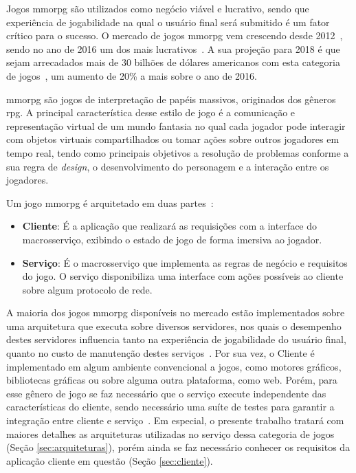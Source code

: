 Jogos \ac{mmorpg} são utilizados como negócio viável e lucrativo, sendo que experiência de jogabilidade na qual o usuário final será submitido é um fator crítico para o sucesso.
%
O mercado de jogos \ac{mmorpg} vem crescendo desde 2012~\cite{new_york_times}, sendo no ano de 2016 um dos mais lucrativos~\cite{statista_2016}.
%
A sua projeção para 2018 é que sejam arrecadados mais de 30 bilhões de dólares americanos com esta categoria de jogos~\cite{statista_2018}, um aumento de 20\% a mais sobre o ano de 2016.



\ac{mmorpg} são jogos de interpretação de papéis massivos, originados dos gêneros \ac{rpg}.
%
A principal característica desse estilo de jogo é a comunicação e representação virtual de um mundo fantasia no qual cada jogador pode interagir com objetos virtuais compartilhados ou tomar ações sobre outros jogadores em tempo real, tendo como principais objetivos a resolução de problemas conforme a sua regra de \textit{design}, o desenvolvimento do personagem e a interação entre os jogadores\cite{video_game_technologies}.


Um jogo \ac{mmorpg} é arquitetado em duas partes~\cite{mmo_analytic}:
\begin{itemize}
  \item \textbf{Cliente}: É a aplicação que realizará as requisições com a interface do macrosserviço, exibindo o estado de jogo de forma imersiva ao jogador.
  \item \textbf{Serviço}: É o macrosserviço que implementa as regras de negócio e requisitos do jogo.
  O serviço disponibiliza uma interface com ações possíveis ao cliente sobre algum protocolo de rede.
\end{itemize}



A maioria dos jogos \ac{mmorpg} disponíveis no mercado estão implementados sobre uma arquitetura que executa sobre diversos servidores\cite{stephenclarkewillson2017}, nos quais o desempenho destes servidores influencia tanto na experiência de jogabilidade do usuário final, quanto no custo de manutenção destes serviços~\cite{1417630}.
%
Por sua vez, o Cliente é implementado em algum ambiente convencional a jogos, como motores gráficos, bibliotecas gráficas ou sobre alguma outra plataforma, como web.
%
Porém, para esse gênero de jogo se faz necessário que o serviço execute independente das características do cliente, sendo necessário uma suíte de testes para garantir a integração entre cliente e serviço~\cite{albion_online_unite}.
%
Em especial, o presente trabalho tratará com maiores detalhes as arquiteturas utilizadas no serviço dessa categoria de jogos (Seção \ref{sec:arquiteturas}), porém ainda se faz necessário conhecer os requisitos da aplicação cliente em questão (Seção \ref{sec:cliente}).



